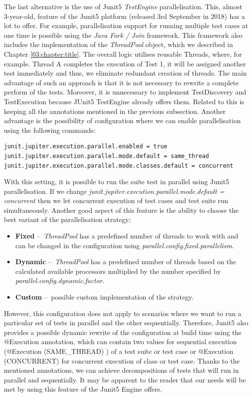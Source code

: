 The last alternative is the use of Junit5 \emph{TestEngine} parallelisation.
This, almost 3-year-old, feature of the Junit5 platform (released 3rd September in 2018) has a lot to offer.
For example, parallelisation support for running multiple test cases at one time is possible using the \emph{Java Fork / Join} framework.
This framework also includes the implementation of the \emph{ThreadPool} object, which we described in Chapter \ref{03:chapter:title}.
The overall logic utilises reusable Threads, where, for example.
Thread A completes the execution of Test 1, it will be assigned another test immediately and thus, we eliminate redundant creation of threads.
The main advantage of such an approach is that it is not necessary to rewrite a complete perform of the tests.
Moreover, it is unnecessary to implement TestDiscovery and TestExecution because JUnit5 TestEngine already offers them.
Related to this is keeping all the annotations mentioned in the previous subsection.
Another advantage is the possibility of configuration where we can enable parallelisation using the following commands:
\begin{verbatim}
junit.jupiter.execution.parallel.enabled = true
junit.jupiter.execution.parallel.mode.default = same_thread
junit.jupiter.execution.parallel.mode.classes.default = concurrent
\end{verbatim}
With this setting, it is possible to run the suite test in parallel using Junit5 parallelisation.
If we change \emph{junit.jupiter.execution.parallel.mode.default = concurrent} then we let concurrent execution of test cases and test suite run simultaneously.
Another good aspect of this feature is the ability to choose the best variant of the parallelisation strategy:
\begin{itemize}[itemsep=1mm, parsep=0pt]
    \item \textbf{Fixed} \---\ \emph{ThreadPool} has a predefined number of threads to work with and can be changed in the configuration using \emph{parallel.config.fixed.parallelism}.
    \item \textbf{Dynamic} \---\ \emph{ThreadPool} has a predefined number of threads based on the calculated available processors multiplied by the number specified by \emph{parallel.config.dynamic.factor}.
    \item \textbf{Custom} \---\ possible custom implementation of the strategy.
\end{itemize}
However, this configuration does not apply to scenarios where we want to run a particular set of tests in parallel and the other sequentially.
Therefore, Junit5 also provides a possible dynamic rewrite of the configuration at build time using the @Execution annotation, which can contain two values for sequential execution (@Execution (SAME\_THREAD) ) of a test suite or test case or @Execution (CONCURRENT) for concurrent execution of class or test case.
Thanks to the mentioned annotations, we can achieve decompositions of tests that will run in parallel and sequentially.
It may be apparent to the reader that our needs will be met by using this feature of the Junit5 Engine offers.

